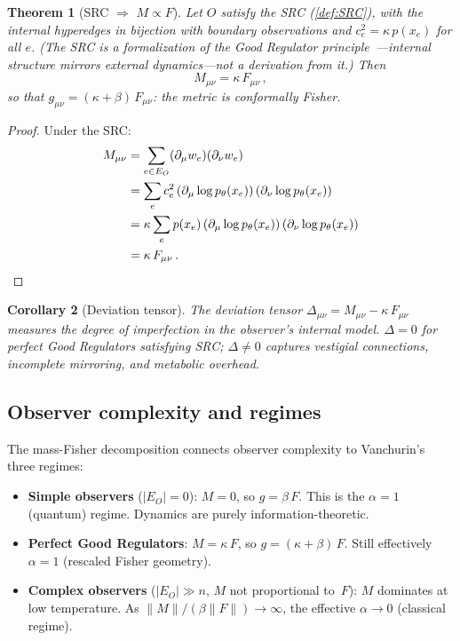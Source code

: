 \documentclass[11pt]{article}
\newtheorem{theorem}{Theorem}[section]
\newtheorem{corollary}[theorem]{Corollary}
\theoremstyle{definition}
\theoremstyle{remark}
\begin{document}
\begin{theorem}[SRC $\Rightarrow$ $M \propto F$]
\label{thm:SRC}
Let $O$ satisfy the SRC (\cref{def:SRC}), with the internal hyperedges in
bijection with boundary observations and
$c_e^2 = \kappa\, p(x_e)$ for all $e$.
(The SRC is a formalization of the Good Regulator
principle~\cite{ConantAshby1970,Virgo2025}---internal structure mirrors
external dynamics---not a derivation from it.)
Then
\begin{equation}
\label{eq:M-prop-F}
M_{\mu\nu} = \kappa\, F_{\mu\nu}\,,
\end{equation}
so that $g_{\mu\nu} = (\kappa + \beta)\, F_{\mu\nu}$:
the metric is conformally Fisher.
\end{theorem}

\begin{proof}
Under the SRC:
\begin{align*}
M_{\mu\nu} &= \sum_{e \in E_O} (\partial_\mu w_e)(\partial_\nu w_e) \\
&= \sum_e c_e^2\, (\partial_\mu \log p_\theta(x_e))\,
   (\partial_\nu \log p_\theta(x_e)) \\
&= \kappa \sum_e p(x_e)\, (\partial_\mu \log p_\theta(x_e))\,
   (\partial_\nu \log p_\theta(x_e)) \\
&= \kappa\, F_{\mu\nu}\,. \qedhere
\end{align*}
\end{proof}

\begin{corollary}[Deviation tensor]
\label{cor:deviation}
The deviation tensor $\Delta_{\mu\nu} = M_{\mu\nu} - \kappa\,F_{\mu\nu}$
measures the degree of imperfection in the observer's internal model.
$\Delta = 0$ for perfect Good Regulators satisfying SRC;
$\Delta \neq 0$ captures vestigial connections, incomplete mirroring,
and metabolic overhead.
\end{corollary}

\subsection{Observer complexity and regimes}
\label{sec:observer-complexity}

The mass-Fisher decomposition connects observer complexity to
Vanchurin's three regimes:

\begin{itemize}
\item \textbf{Simple observers} ($|E_O| = 0$): $M = 0$, so $g = \beta\,F$.
  This is the $\alpha = 1$ (quantum) regime.
  Dynamics are purely information-theoretic.

\item \textbf{Perfect Good Regulators}: $M = \kappa\,F$, so
  $g = (\kappa + \beta)\,F$.  Still effectively $\alpha = 1$ (rescaled
  Fisher geometry).

\item \textbf{Complex observers} ($|E_O| \gg n$, $M$ not proportional
  to~$F$): $M$ dominates at low temperature.
  As $\|M\| / (\beta \|F\|) \to \infty$, the effective $\alpha \to 0$
  (classical regime).
\end{itemize}
\end{document}
